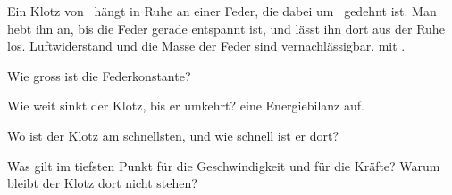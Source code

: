 Ein Klotz von \mKO\ hängt in Ruhe an einer Feder, die dabei um \xoO\ gedehnt ist. Man hebt ihn an, bis die Feder gerade entspannt ist, und lässt ihn dort aus der Ruhe los. Luftwiderstand und die Masse der Feder sind vernachlässigbar.  mit \gO.

\begin{abcliste}
\abc
Wie gross ist die Federkonstante?

\abc
Wie weit sinkt der Klotz, bis er umkehrt?  eine Energiebilanz auf.

\abc
Wo ist der Klotz am schnellsten, und wie schnell ist er dort?

\abc
Was gilt im tiefsten Punkt für die Geschwindigkeit und für die Kräfte? Warum bleibt der Klotz dort nicht stehen?
\end{abcliste}
